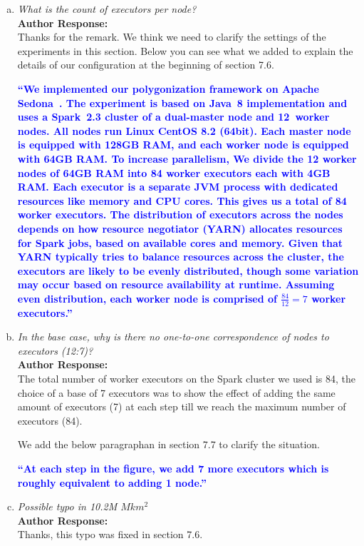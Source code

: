 \documentclass[10pt]{article}
\begin{document}
\begin{enumerate}[(a)]
\item \textit{
What is the count of executors per node?
} \\

\textbf{Author Response:}\\
Thanks for the remark.  We think we need to clarify the settings of the experiments in this section.  Below you can see what we added to explain the details of our configuration at the beginning of section  7.6.

\textcolor{blue}{
\textbf{
``We implemented our polygonization framework on Apache Sedona~\cite{sedona}.
The experiment is based on Java~8 implementation and uses a Spark~2.3 cluster of a dual-master node and 12~worker nodes. All nodes run Linux CentOS 8.2 (64bit).
Each master node is equipped with 128GB RAM, and each worker node is equipped with 64GB RAM.
To increase parallelism, We divide the 12 worker nodes of 64GB RAM into 84 worker executors each with 4GB RAM. Each executor is a separate JVM process with dedicated resources like memory and CPU cores. This gives us a total of 84 worker executors.
The distribution of executors across the nodes depends on how resource negotiator (YARN) allocates resources for Spark jobs, based on available cores and memory. Given that YARN typically tries to balance resources across the cluster, the executors are likely to be evenly distributed, though some variation may occur based on resource availability at runtime.
Assuming even distribution, each worker node is comprised of $\frac{84}{12} = 7$ worker executors.''
}} \\

\item \textit{
In the base case, why is there no one-to-one correspondence of nodes to executors (12:7)?
} \\

\textbf{Author Response:}\\

The total number of worker executors on the Spark cluster we used is 84, the choice of a base of 7 executors was to show the effect of adding the same amount of executors (7) at each step till we reach the maximum number of executors (84).

We add the below paragraphan in section 7.7 to clarify the situation.

\textcolor{blue}{\textbf{
``At each step in the figure, we add 7 more executors which is roughly equivalent to adding 1 node.''
}}

\item \textit{Possible typo in 10.2M $Mkm^2$}\\

\textbf{Author Response:}\\

Thanks, this typo was fixed in section 7.6.

\end{enumerate}
\end{document}
